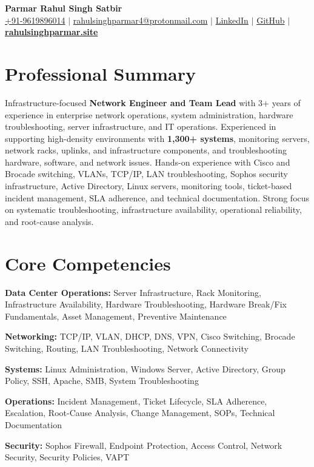 \documentclass[letterpaper,10pt]{article}
\begin{document}
\begin{center}
    \textbf{\Huge Parmar Rahul Singh Satbir} \\ \vspace{5pt}
    \small
    \href{tel:+919619896014}{+91-9619896014} $|$
    \href{mailto:rahulsinghparmar4@protonmail.com}{rahulsinghparmar4@protonmail.com} $|$
    \href{https://www.linkedin.com/in/rahulsinghparmar4/}{LinkedIn} $|$
    \href{https://github.com/RahulSinghParmar}{GitHub} $|$
    \href{https://rahulsinghparmar.site/}{\textbf{rahulsinghparmar.site}}
\end{center}

\section{Professional Summary}

Infrastructure-focused \textbf{Network Engineer and Team Lead} with 3+ years of experience in enterprise network operations, system administration, hardware troubleshooting, server infrastructure, and IT operations. Experienced in supporting high-density environments with \textbf{1,300+ systems}, monitoring servers, network racks, uplinks, and infrastructure components, and troubleshooting hardware, software, and network issues. Hands-on experience with Cisco and Brocade switching, VLANs, TCP/IP, LAN troubleshooting, Sophos security infrastructure, Active Directory, Linux servers, monitoring tools, ticket-based incident management, SLA adherence, and technical documentation. Strong focus on systematic troubleshooting, infrastructure availability, operational reliability, and root-cause analysis.

\section{Core Competencies}

\begin{itemize}[leftmargin=0.15in]
    \small{\item{
        \textbf{Data Center Operations:} Server Infrastructure, Rack Monitoring, Infrastructure Availability, Hardware Troubleshooting, Hardware Break/Fix Fundamentals, Asset Management, Preventive Maintenance
    }}
    \small{\item{
        \textbf{Networking:} TCP/IP, VLAN, DHCP, DNS, VPN, Cisco Switching, Brocade Switching, Routing, LAN Troubleshooting, Network Connectivity
    }}
    \small{\item{
        \textbf{Systems:} Linux Administration, Windows Server, Active Directory, Group Policy, SSH, Apache, SMB, System Troubleshooting
    }}
    \small{\item{
        \textbf{Operations:} Incident Management, Ticket Lifecycle, SLA Adherence, Escalation, Root-Cause Analysis, Change Management, SOPs, Technical Documentation
    }}
    \small{\item{
        \textbf{Security:} Sophos Firewall, Endpoint Protection, Access Control, Network Security, Security Policies, VAPT
    }}
\end{itemize}
\end{document}
